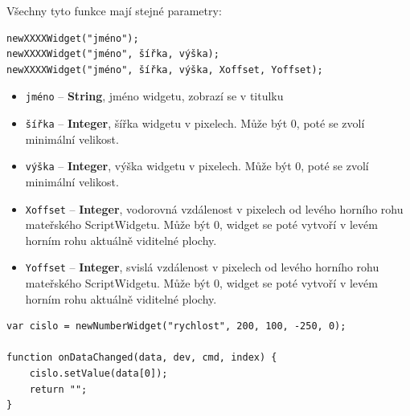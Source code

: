 \documentclass[12pt, a4paper, oneside]{article}
\newcommand{\It}{\textit}  %
\begin{document}
Všechny tyto funkce mají stejné parametry:
{\color{blue}
\begin{verbatim}newXXXXWidget("jméno");
newXXXXWidget("jméno", šířka, výška);
newXXXXWidget("jméno", šířka, výška, Xoffset, Yoffset);
\end{verbatim}
}

\begin{itemize}
    \item \verb/jméno/ -- {\bf String}, jméno widgetu, zobrazí se v titulku
    \item \verb/šířka/ -- {\bf Integer}, šířka widgetu v pixelech. Může být 0, poté se zvolí minimální velikost.
    \item \verb/výška/ -- {\bf Integer}, výška widgetu v pixelech. Může být 0, poté se zvolí minimální velikost.
    \item \verb/Xoffset/ -- {\bf Integer}, vodorovná vzdálenost v pixelech od levého horního rohu mateřského ScriptWidgetu. Může být 0, widget se poté vytvoří v levém horním rohu aktuálně viditelné plochy.
     \item \verb/Yoffset/ -- {\bf Integer}, svislá vzdálenost v pixelech od levého horního rohu mateřského ScriptWidgetu. Může být 0, widget se poté vytvoří v levém horním rohu aktuálně viditelné plochy.
\end{itemize}
\begin{lstlisting}[caption=Vytvoření widgetu \It{číslo} a nastavení jeho hodnoty z příchozích dat]
var cislo = newNumberWidget("rychlost", 200, 100, -250, 0);

function onDataChanged(data, dev, cmd, index) {
    cislo.setValue(data[0]);
    return "";
}
\end{lstlisting}
\newpage
{}
\end{document}
